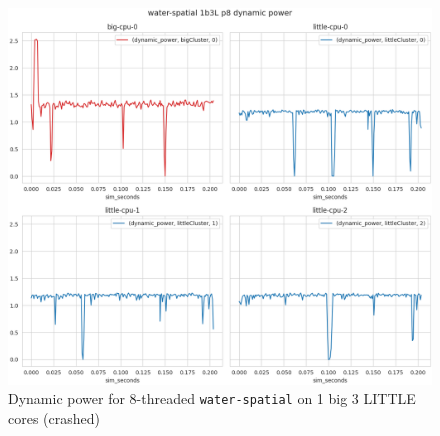 \begin{figure}[H]
    \centering
\includegraphics[height=0.6\textheight]{roi-plots/water-spatial/1b3L/p8-fail-dyn-pow.png}
\caption{Dynamic power for 8-threaded \texttt{water-spatial} on 1 big 3
         LITTLE cores (crashed)}
\end{figure}
